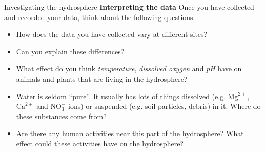 \begin{Investigation}{Investigating the hydrosphere}
\textbf{Interpreting the data}
Once you have collected and recorded your data, think about the following questions:
\begin{itemize}[noitemsep]
\item How does the data you have collected vary at different sites?
\item Can you explain these differences?
\item What effect do you think \textsl{temperature}, \textsl{dissolved oxygen} and \textsl{pH} have on animals and plants that are living in the hydrosphere?
\item Water is seldom ``pure''. It usually has lots of things dissolved (e.g.\@{} ${\text{Mg}}^{2+}$, ${\text{Ca}}^{2+}$ and $\text{NO}_{3}^{-}$ ions) or suspended (e.g.\@{} soil particles, debris) in it. Where do these substances come from?
\item Are there any human activities near this part of the hydrosphere? What effect could these activities have on the hydrosphere?
\end{itemize}
\end{Investigation}
